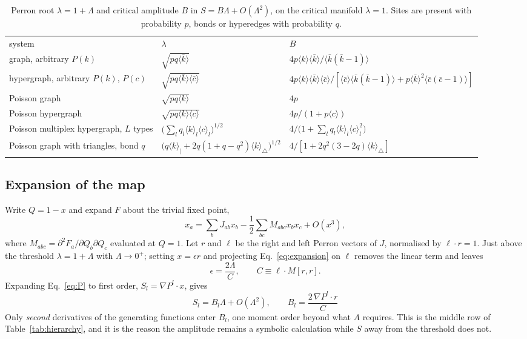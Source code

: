 \documentclass[aps,pre,twocolumn,superscriptaddress,floatfix,longbibliography]{revtex4-2}
\newcommand{\ave}[1]{\langle #1 \rangle}
\newcommand{\kb}{\bar{k}}
\newcommand{\cb}{\bar{c}}
\begin{document}
\begin{table}[t]
\caption{\label{tab:amplitudes}Perron root $\lambda=1+\Lambda$ and critical
amplitude $B$ in $S=B\Lambda+O(\Lambda^2)$, on the critical manifold
$\lambda=1$. Sites are present with probability $p$, bonds or hyperedges with
probability $q$.}
\begin{ruledtabular}
\begin{tabular}{lll}
system & $\lambda$ & $B$ \\
\colrule
graph, arbitrary $P(k)$ &
  $\sqrt{pq\ave{\kb}}$ &
  $4p\ave{k}\ave{\kb}\big/\ave{\kb(\kb-1)}$ \\[2pt]
hypergraph, arbitrary $P(k)$, $P(c)$ &
  $\sqrt{pq\ave{\kb}\ave{\cb}}$ &
  $4p\ave{k}\ave{\kb}\ave{\cb}\big/
   \left[\ave{\cb}\ave{\kb(\kb-1)}+p\ave{\kb}^2\ave{\cb(\cb-1)}\right]$ \\[2pt]
Poisson graph &
  $\sqrt{pq\ave{k}}$ &
  $4p$ \\[2pt]
Poisson hypergraph &
  $\sqrt{pq\ave{k}\ave{c}}$ &
  $4p\big/\left(1+p\ave{c}\right)$ \\[2pt]
Poisson multiplex hypergraph, $L$ types &
  $\big(\sum_l q_l\ave{k}_l\ave{c}_l\big)^{1/2}$ &
  $4\big/\big(1+\sum_l q_l\ave{k}_l\ave{c}_l^2\big)$ \\[2pt]
Poisson graph with triangles, bond $q$ &
  $\big(q\ave{k}_|+2q(1+q-q^2)\ave{k}_\triangle\big)^{1/2}$ &
  $4\big/\left[1+2q^2(3-2q)\ave{k}_\triangle\right]$ \\
\end{tabular}
\end{ruledtabular}
\end{table}

\subsection{Expansion of the map}

Write $Q=1-x$ and expand $F$ about the trivial fixed point,
\begin{equation}
  x_a=\sum_b J_{ab}x_b-\frac12\sum_{bc}M_{abc}x_bx_c+O(x^3),
  \label{eq:expansion}
\end{equation}
where $M_{abc}=\partial^2F_a/\partial Q_b\partial Q_c$ evaluated at $Q=1$.
Let $r$ and $\ell$ be the right and left Perron vectors of $J$, normalised by
$\ell\cdot r=1$. Just above the threshold $\lambda=1+\Lambda$ with
$\Lambda\to0^+$; setting $x=\epsilon r$ and projecting Eq.~\eqref{eq:expansion}
on $\ell$ removes the linear term and leaves
\begin{equation}
  \epsilon=\frac{2\Lambda}{C},\qquad C\equiv\ell\cdot M[r,r].
  \label{eq:epsilon}
\end{equation}
Expanding Eq.~\eqref{eq:P} to first order, $S_l=\nabla P^l\cdot x$, gives
\begin{equation}
  \boxed{\;S_l=B_l\Lambda+O(\Lambda^2),\qquad
  B_l=\frac{2\,\nabla P^l\cdot r}{C}\;}
  \label{eq:B}
\end{equation}
Only \emph{second} derivatives of the generating functions enter $B_l$, one
moment order beyond what $A$ requires. This is the middle row of
Table~\ref{tab:hierarchy}, and it is the reason the amplitude remains a symbolic
calculation while $S$ away from the threshold does not.
\end{document}
